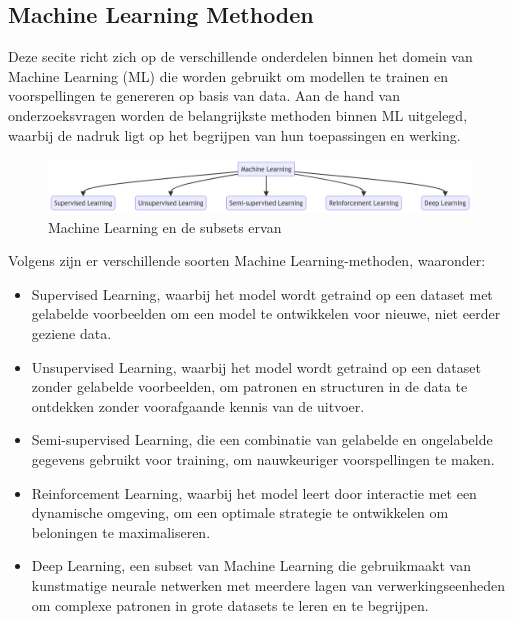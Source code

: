 \subsection{Machine Learning Methoden}

Deze secite richt zich op de verschillende onderdelen binnen het domein van Machine Learning (ML) die worden gebruikt om modellen te trainen en voorspellingen te genereren op basis van data. Aan de hand van onderzoeksvragen worden de belangrijkste methoden binnen ML uitgelegd, waarbij de nadruk ligt op het begrijpen van hun toepassingen en werking.

\begin{figure}[h]
    \includegraphics[width=\linewidth]{graphics/mm.png}
    \caption{Machine Learning en de subsets ervan}
    \label{fig:ML_subsets}
\end{figure}

Volgens \textcite{Mahesh2019} zijn er verschillende soorten Machine Learning-methoden, waaronder:

\begin{itemize}
    \item Supervised Learning, waarbij het model wordt getraind op een dataset met gelabelde voorbeelden om een model te ontwikkelen voor nieuwe, niet eerder geziene data.

    \item Unsupervised Learning, waarbij het model wordt getraind op een dataset zonder gelabelde voorbeelden, om patronen en structuren in de data te ontdekken zonder voorafgaande kennis van de uitvoer.

    \item Semi-supervised Learning, die een combinatie van gelabelde en ongelabelde gegevens gebruikt voor training, om nauwkeuriger voorspellingen te maken.

    \item Reinforcement Learning, waarbij het model leert door interactie met een dynamische omgeving, om een optimale strategie te ontwikkelen om beloningen te maximaliseren.

    \item Deep Learning, een subset van Machine Learning die gebruikmaakt van kunstmatige neurale netwerken met meerdere lagen van verwerkingseenheden om complexe patronen in grote datasets te leren en te begrijpen.
\end{itemize}

